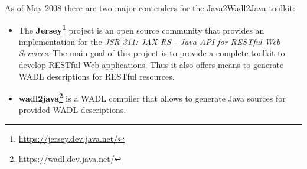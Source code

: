 As of May 2008 there are two major contenders for the Java2Wadl2Java toolkit: 
\begin{itemize}
\item{The {\bf Jersey\footnote{\url{https://jersey.dev.java.net/}}} project is an open source community that provides an implementation for the \emph{JSR-311: JAX-RS - Java API for RESTful Web Services}. The main goal of this project is to provide a complete toolkit to develop RESTful Web applications. Thus it also offers means to generate WADL descriptions for RESTful resources.}
\item{{\bf wadl2java\footnote{\url{https://wadl.dev.java.net/}}} is a WADL compiler that allows to generate Java sources for provided WADL descriptions.}
\end{itemize}

